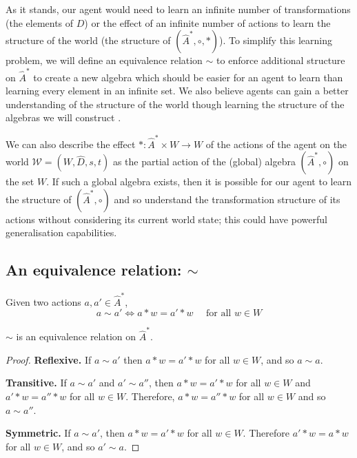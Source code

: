 As it stands, our agent would need to learn an infinite number of transformations (the elements of $D$) or the effect of an infinite number of actions to learn the structure of the world (the structure of $(\hat{A}^{\ast}, \circ, \ast)$).
To simplify this learning problem, we will define an equivalence relation $\sim$ to enforce additional structure on $\hat{A}^{\ast}$ to create a new algebra which should be easier for an agent to learn than learning every element in an infinite set.
We also believe agents can gain a better understanding of the structure of the world though learning the structure of the algebras we will construct .

We can also describe the effect $\ast: \hat{A}^{\ast} \times W \to W$ of the actions of the agent on the world $\mathscr{W} = (W, \hat{D}, s, t)$ as the partial action of the (global) algebra $(\hat{A}^{\ast}, \circ)$ on the set $W$.
If such a global algebra exists, then it is possible for our agent to learn the structure of $(\hat{A}^{\ast}, \circ)$ and so understand the transformation structure of its actions without considering its current world state; this could have powerful generalisation capabilities.

\subsection{An equivalence relation: $\sim$}

\begin{definition}
    Given two actions $a, a' \in \hat{A}^{\ast}$,
    \begin{equation}
        a \sim a' \Leftrightarrow a \ast w = a' \ast w \quad \text{ for all $w \in W$}
    \end{equation}
\end{definition}

\begin{proposition}
    $\sim$ is an equivalence relation on $\hat{A}^{\ast}$.
\end{proposition}
\begin{proof}
    \textbf{Reflexive.}
    If $a \sim a'$ then $a \ast w = a' \ast w$ for all $w \in W$, and so $a \sim a$.

    \textbf{Transitive.}
    If $a \sim a'$ and $a' \sim a''$, then $a \ast w = a' \ast w$ for all $w \in W$ and $a' \ast w = a'' \ast w$ for all $w \in W$.
    Therefore, $a \ast w = a'' \ast w$ for all $w \in W$ and so $a \sim a''$.

    \textbf{Symmetric.}
    If $a \sim a'$, then $a \ast w = a' \ast w$ for all $w \in W$.
    Therefore $a' \ast w = a \ast w$ for all $w \in W$, and so $a' \sim a$.
\end{proof}

